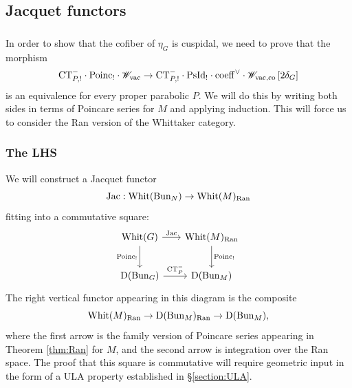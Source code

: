 \subsection{Jacquet functors} 

\subsubsection{} In order to show that the cofiber of $\eta_G$ is cuspidal, we need to prove that the morphism
    \[
    \mathrm{CT}_{P, !}^- \cdot \mathrm{Poinc}_! \cdot \mathscr{W}_{\mathrm{vac}} 
    \to \mathrm{CT}_{P, !}^- \cdot \mathrm{PsId}_! \cdot \mathrm{coeff}^\vee \cdot \mathscr{W}_{\mathrm{vac},\mathrm{co}} \, [2\delta_G]
    \]
is an equivalence for every proper parabolic $P$. We will do this by writing both sides in terms of Poincare series for $M$ and applying induction. This will force us to consider the Ran version of the Whittaker category.

\subsubsection{The LHS} We will construct a Jacquet functor 
  \[\mathrm{Jac} : \mathrm{Whit}(\mathrm{Bun}_N) \to \mathrm{Whit}(M)_{\mathrm{Ran}}\]
fitting into a commutative square:
\[
\begin{tikzcd}[
  column sep={7.5em,between origins},
  row sep={4em,between origins}
]
    \Whit(G) \arrow[d, "\Poinc_!" left] \arrow[r, "\Jac"] & \Whit(M)_\Ran \arrow[d, "\Poinc_!"] \\
    \DMod(\Bun_G) \arrow[r, "\CT_P^-"] & \DMod(\Bun_M) 
\end{tikzcd}
\]
The right vertical functor appearing in this diagram is the composite
    \[\mathrm{Whit}(M)_{\mathrm{Ran}} \to \mathrm{D}(\mathrm{Bun}_M)_{\mathrm{Ran}} \to \mathrm{D}(\mathrm{Bun}_M),\]
where the first arrow is the family version of Poincare series appearing in Theorem \ref{thm:Ran} for $M$, and the second arrow is integration over the Ran space. The proof that this square is commutative will require geometric input in the form of a ULA property established in \S\ref{section:ULA}.

